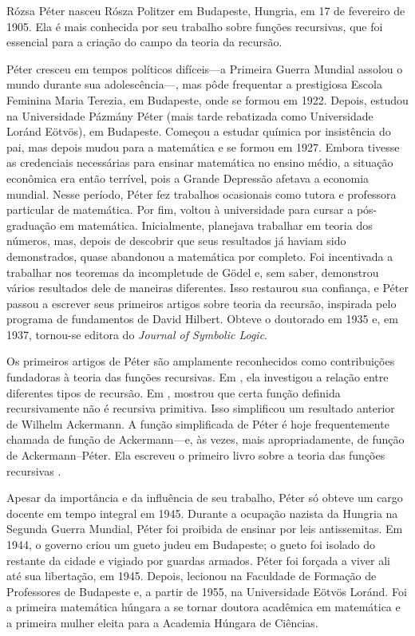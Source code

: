 \documentclass[../../../include/open-logic-section]{subfiles}
\begin{document}


 
R\'ozsa P\'eter nasceu R\'osza Politzer em Budapeste, Hungria, em 17 de
fevereiro de 1905. Ela é mais conhecida por seu trabalho sobre funções
recursivas, que foi essencial para a criação do campo da teoria da
recursão.

P\'eter cresceu em tempos políticos difíceis---a Primeira Guerra
Mundial assolou o mundo durante sua adolescência---, mas pôde frequentar
a prestigiosa Escola Feminina Maria Terezia, em Budapeste, onde se
formou em 1922. Depois, estudou na Universidade P\'azm\'any P\'eter
(mais tarde rebatizada como Universidade Lor\'and E\"otv\"os), em
Budapeste. Começou a estudar química por insistência do pai, mas depois
mudou para a matemática e se formou em 1927. Embora tivesse as
credenciais necessárias para ensinar matemática no ensino médio, a
situação econômica era então terrível, pois a Grande Depressão afetava
a economia mundial. Nesse período, P\'eter fez trabalhos ocasionais
como tutora e professora particular de matemática. Por fim, voltou à
universidade para cursar a pós-graduação em matemática. Inicialmente,
planejava trabalhar em teoria dos números, mas, depois de descobrir que
seus resultados já haviam sido demonstrados, quase abandonou a
matemática por completo. Foi incentivada a trabalhar nos teoremas da
incompletude de G\"odel e, sem saber, demonstrou vários resultados dele
de maneiras diferentes. Isso restaurou sua confiança, e P\'eter passou
a escrever seus primeiros artigos sobre teoria da recursão, inspirada
pelo programa de fundamentos de David Hilbert. Obteve o doutorado em
1935 e, em 1937, tornou-se editora do \emph{Journal of Symbolic Logic}.

Os primeiros artigos de P\'eter são amplamente reconhecidos como
contribuições fundadoras à teoria das funções recursivas. Em
\cite{Peter1935a}, ela investigou a relação entre diferentes tipos de
recursão. Em \cite{Peter1935b}, mostrou que certa função definida
recursivamente não é recursiva primitiva. Isso simplificou um resultado
anterior de Wilhelm Ackermann. A função simplificada de P\'eter é hoje
frequentemente chamada de função de Ackermann---e, às vezes, mais
apropriadamente, de função de Ackermann--P\'eter. Ela escreveu o primeiro
livro sobre a teoria das funções recursivas \citep{Peter1951}.

Apesar da importância e da influência de seu trabalho, P\'eter só
obteve um cargo docente em tempo integral em 1945. Durante a ocupação
nazista da Hungria na Segunda Guerra Mundial, P\'eter foi proibida de
ensinar por leis antissemitas. Em 1944, o governo criou um gueto judeu
em Budapeste; o gueto foi isolado do restante da cidade e vigiado por
guardas armados. P\'eter foi forçada a viver ali até sua libertação, em
1945. Depois, lecionou na Faculdade de Formação de Professores de
Budapeste e, a partir de 1955, na Universidade E\"otv\"os Lor\'and. Foi a
primeira matemática húngara a se tornar doutora acadêmica em matemática
e a primeira mulher eleita para a Academia Húngara de Ciências.
\end{document}
